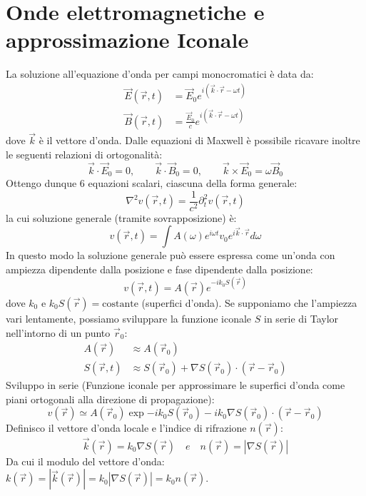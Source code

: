\documentclass[openany,a4paper,12pt]{book}
\begin{document}
\section{Onde elettromagnetiche e approssimazione Iconale}
La soluzione all'equazione d'onda per campi monocromatici è data da:
\begin{align}
    \vec{E}(\vec{r}, t) &= \vec{E}_0 e^{i(\vec{k} \cdot \vec{r} - \omega t)} \\
    \vec{B}(\vec{r}, t) &= \frac{\vec{E}_0}{c} e^{i(\vec{k} \cdot \vec{r} - \omega t)}
\end{align}
dove $\vec{k}$ è il vettore d'onda. Dalle equazioni di Maxwell è possibile ricavare inoltre le seguenti relazioni di ortogonalità:
\begin{equation}
    \vec{k} \cdot \vec{E}_0 = 0, \qquad \vec{k} \cdot \vec{B}_0 = 0, \qquad \vec{k} \times \vec{E}_0 = \omega \vec{B}_0
\end{equation}
Ottengo dunque $6$ equazioni scalari, ciascuna della forma generale:
\begin{equation}
    \nabla^2 v(\vec{r}, t) = \frac{1}{c^2} \partial_t^2 v(\vec{r}, t)
\end{equation}
la cui soluzione generale (tramite sovrapposizione) è:
\begin{equation}
    v(\vec{r}, t) = \int A(\omega) e^{i\omega t} v_0 e^{i \vec{k} \cdot \vec{r}} d\omega
\end{equation}
In questo modo la soluzione generale può essere espressa come un'onda con ampiezza dipendente dalla posizione e fase dipendente dalla posizione:
\begin{equation}
    v(\vec{r}, t) = A(\vec{r}) e^{-i k_0 S(\vec{r})}
\end{equation}
dove $k_0$ e $k_0 S(\vec{r}) = \text{costante}$ (superfici d'onda). Se supponiamo che l'ampiezza vari lentamente, possiamo sviluppare la funzione iconale $S$ in serie di Taylor nell'intorno di un punto $\vec{r}_0$:
\begin{align}
    A(\vec{r}) &\approx A(\vec{r}_0) \\
    S(\vec{r}, t) &\approx S(\vec{r}_0) + \nabla S(\vec{r}_0) \cdot (\vec{r} - \vec{r}_0)
\end{align}
Sviluppo in serie (Funzione iconale per approssimare le superfici d'onda come piani ortogonali alla direzione di propagazione):
\begin{equation}
    v(\vec{r}) \simeq A(\vec{r}_0) \exp{-i k_0 S(\vec{r}_0) - i k_0 \nabla S(\vec{r}_0) \cdot (\vec{r} - \vec{r}_0)}
\end{equation}
Definisco il vettore d'onda locale e l'indice di rifrazione $n(\vec{r})$:
\begin{equation}
    \vec{k}(\vec{r}) = k_0 \nabla S(\vec{r}) \quad e \quad n(\vec{r}) = |\nabla S(\vec{r})|
\end{equation}
Da cui il modulo del vettore d'onda: $k(\vec{r}) = |\vec{k}(\vec{r})| = k_0 |\nabla S(\vec{r})| = k_0 n(\vec{r})$.
\end{document}
